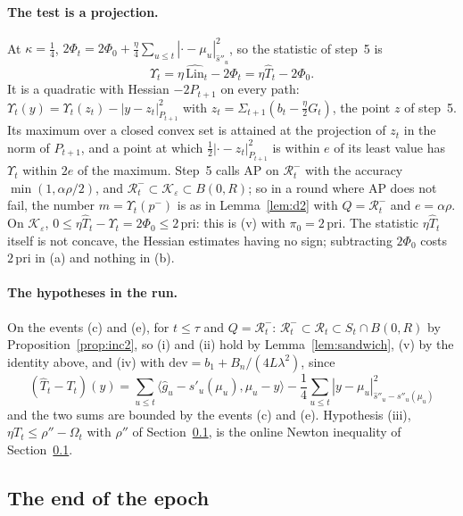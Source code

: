 \documentclass[11pt]{amsart}
\theoremstyle{definition}
\numberwithin{equation}{section}
\newcommand{\cK}{\mathcal{K}}
\newcommand{\ip}[1]{\langle #1\rangle}
\begin{document}
\paragraph{The test is a projection.} At $\kappa=\frac14$, $2\Phi_t=2\Phi_0+\frac\eta4\sum_{u\le t}|\cdot-\mu_u|^2_{\hat s''_u}$, so the statistic of step~5 is
\[
\Upsilon_t=\eta\,\widehat{\mathrm{Lin}}_t-2\Phi_t=\eta\hat T_t-2\Phi_0 .
\]
It is a quadratic with Hessian $-2P_{t+1}$ on every path: $\Upsilon_t(y)=\Upsilon_t(z_t)-|y-z_t|^2_{P_{t+1}}$ with $z_t=\Sigma_{t+1}(b_t-\frac\eta2G_t)$, the point $z$ of step~5. Its maximum over a closed convex set is attained at the projection of $z_t$ in the norm of $P_{t+1}$, and a point at which $\frac12|\cdot-z_t|^2_{P_{t+1}}$ is within $e$ of its least value has $\Upsilon_t$ within $2e$ of the maximum. Step~5 calls AP on $\mathcal R^-_t$ with the accuracy $\min(1,\alpha\rho/2)$, and $\mathcal R^-_t\subset\cK_\varepsilon\subset B(0,R)$; so in a round where AP does not fail, the number $m=\Upsilon_t(p^-)$ is as in Lemma~\ref{lem:d2} with $Q=\mathcal R^-_t$ and $e=\alpha\rho$. On $\cK_\varepsilon$, $0\le\eta\hat T_t-\Upsilon_t=2\Phi_0\le2\,\mathrm{pri}$: this is (v) with $\pi_0=2\,\mathrm{pri}$. The statistic $\eta\hat T_t$ itself is not concave, the Hessian estimates having no sign; subtracting $2\Phi_0$ costs $2\,\mathrm{pri}$ in (a) and nothing in (b).

\paragraph{The hypotheses in the run.} On the events (c) and (e), for $t\le\tau$ and $Q=\mathcal R^-_t$: $\mathcal R^-_t\subset\mathcal R_t\subset S_t\cap B(0,R)$ by Proposition~\ref{prop:inc2}, so (i) and (ii) hold by Lemma~\ref{lem:sandwich}, (v) by the identity above, and (iv) with $\mathrm{dev}=b_1+B_n/(4L\lambda^2)$, since
\[
(\hat T_t-T_t)(y)=\sum_{u\le t}\ip{\hat g_u-s'_u(\mu_u),\mu_u-y}-\frac14\sum_{u\le t}|y-\mu_u|^2_{\hat s''_u-s''_u(\mu_u)}
\]
and the two sums are bounded by the events (c) and (e). Hypothesis (iii), $\eta T_t\le\rho''-\Omega_t$ with $\rho''$ of Section~\ref{app:epoch-end}, is the online Newton inequality of Section~\ref{app:epoch-end}.

\subsection{The end of the epoch}\label{app:epoch-end}
\end{document}
